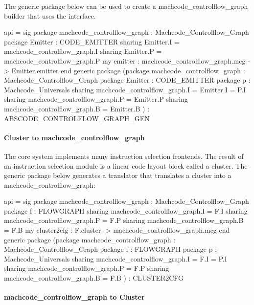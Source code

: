 The generic package  below can be
used to create a machcode_controlflow_graph builder that uses the  interface.
\begin{SML}
 api  = sig
   package machcode_controlflow_graph     : Machcode_Controlflow_Graph
   package Emitter : CODE_EMITTER
       sharing Emitter.I = machcode_controlflow_graph.I
       sharing Emitter.P = machcode_controlflow_graph.P
   my emitter : machcode_controlflow_graph.mcg -> Emitter.emitter
 end
 generic package 
    (package machcode_controlflow_graph     : Machcode_Controlflow_Graph
     package Emitter : CODE_EMITTER
     package p       : Machcode_Universals
         sharing machcode_controlflow_graph.I = Emitter.I = P.I
         sharing machcode_controlflow_graph.P = Emitter.P
         sharing machcode_controlflow_graph.B = Emitter.B
    ) : ABSCODE_CONTROLFLOW_GRAPH_GEN
\end{SML}

\paragraph{Cluster to machcode_controlflow_graph}

The core \MLRISC{} system implements many instruction selection
frontends.  The result of an instruction selection module is a linear 
code layout block called a cluster.  The generic package  below 
generates a translator that translates a cluster into a machcode_controlflow_graph:
\begin{SML}
 api  = sig
   package machcode_controlflow_graph : Machcode_Controlflow_Graph
   package f   : FLOWGRAPH
      sharing machcode_controlflow_graph.I = F.I
      sharing machcode_controlflow_graph.P = F.P
      sharing machcode_controlflow_graph.B = F.B
   my cluster2cfg : F.cluster -> machcode_controlflow_graph.mcg
 end 
 generic package 
   (package machcode_controlflow_graph : Machcode_Controlflow_Graph 
    package f   : FLOWGRAPH
    package p   : Machcode_Universals
       sharing machcode_controlflow_graph.I = F.I = P.I 
       sharing machcode_controlflow_graph.P = F.P
       sharing machcode_controlflow_graph.B = F.B
   ) : CLUSTER2CFG 
\end{SML}

\paragraph{machcode_controlflow_graph to Cluster}

